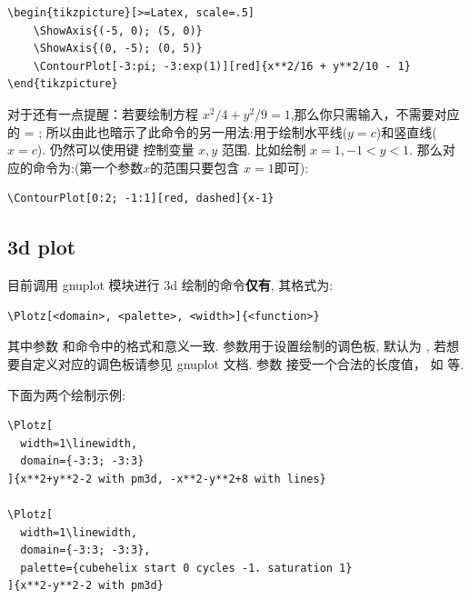 \begin{verbatim}
\begin{tikzpicture}[>=Latex, scale=.5]
    \ShowAxis{(-5, 0); (5, 0)}
    \ShowAxis{(0, -5); (0, 5)}
    \ContourPlot[-3:pi; -3:exp(1)][red]{x**2/16 + y**2/10 - 1}
\end{tikzpicture}
\end{verbatim}

对于\cmd{\ContourPlot}还有一点提醒：若要绘制方程 $x^2/4+y^2/9=1$,那么你只需输入，不需要对应的 = ;
所以由此也暗示了此命令的另一用法:用于绘制水平线($y=c$)和竖直线($x=c$). 仍然可以使用键
控制变量 $x,y$ 范围. 比如绘制 $x=1, -1<y<1$. 那么对应的命令为:(第一个参数$x$的范围只要包含 $x=1$即可):

\begin{verbatim}
\ContourPlot[0:2; -1:1][red, dashed]{x-1}
\end{verbatim}


\subsection{3d plot}
目前调用 gnuplot 模块进行 3d 绘制的命令\textbf{仅有}\cmd{\Plotz}, 其格式为:
\begin{verbatim}
\Plotz[<domain>, <palette>, <width>]{<function>}
\end{verbatim}

其中参数  和命令\cmd{\ContourPlot}中的格式和意义一致. 参数用于设置绘制的调色板, 默认为 
, 若想要自定义对应的调色板请参见 gnuplot 文档. 参数  接受一个合法的长度值，
如 等. 

下面为两个绘制示例:
\begin{verbatim}
\Plotz[
  width=1\linewidth, 
  domain={-3:3; -3:3}
]{x**2+y**2-2 with pm3d, -x**2-y**2+8 with lines}

\Plotz[
  width=1\linewidth, 
  domain={-3:3; -3:3}, 
  palette={cubehelix start 0 cycles -1. saturation 1}
]{x**2-y**2-2 with pm3d}
\end{verbatim}

\begin{center}

\end{center}

